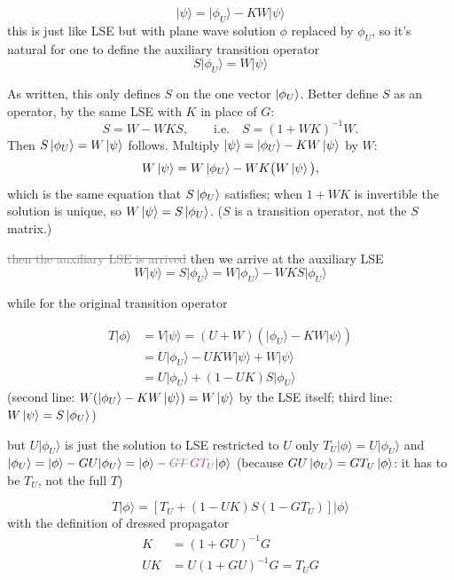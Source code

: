 \documentclass[11pt]{article}
\newcommand{\ai}[1]{\textcolor{aicolor}{#1}}
\newcommand{\aifix}[2]{\textcolor{gray}{\sout{#1}} \textcolor{aicolor}{#2}}
\newcommand{\aifixm}[2]{\textcolor{gray}{\text{\sout{$#1$}}}\,\textcolor{aicolor}{#2}}
\newcommand{\ai}[1]{#1}
\newcommand{\aifix}[2]{#2}
\newcommand{\aifixm}[2]{#2}
\newenvironment{aiadd}{\par}{\par}
\begin{document}
\[
	\lvert \psi \rangle = \lvert \phi_U \rangle - KW\lvert \psi \rangle
\]
this is just like LSE but with plane wave solution $\phi$ replaced by $\phi_U$, so it's natural for one to define the auxiliary transition operator
\[
	S\lvert \phi_U \rangle = W\lvert \psi \rangle
\]
\begin{aiadd}
	As written, this only defines $S$ on the one vector $\ket{\phi_U}$. Better define $S$ as an operator, by the same LSE with $K$ in place of $G$:
	\[
		S=W-WKS,\qquad\text{i.e.}\quad S=(1+WK)^{-1}W .
	\]
	Then $S\ket{\phi_U}=W\ket\psi$ follows. Multiply $\ket\psi=\ket{\phi_U}-KW\ket\psi$ by $W$:
	\[
		W\ket\psi=W\ket{\phi_U}-WK\big(W\ket\psi\big),
	\]
	which is the same equation that $S\ket{\phi_U}$ satisfies; when $1+WK$ is invertible the solution is unique, so $W\ket\psi=S\ket{\phi_U}$. ($S$ is a transition operator, not the $S$ matrix.)
\end{aiadd}

\aifix{then the auxiliary LSE is arrived}{then we arrive at the auxiliary LSE}
\[
	W\lvert \psi \rangle = S\lvert \phi_U \rangle = W\lvert \phi_U \rangle - WKS\lvert \phi_U \rangle
\]

while for the original transition operator

\begin{align}
	T\lvert \phi \rangle & = V\lvert \psi \rangle = (U + W)\left(\lvert \phi_U \rangle - KW\lvert \psi \rangle\right) \\
	                     & = U\lvert \phi_U \rangle - UKW\lvert \psi \rangle + W\lvert \psi \rangle                   \\
	                     & = U\lvert \phi_U \rangle + (1 - UK)S\lvert \phi_U \rangle
\end{align}
\ai{(second line: $W(\ket{\phi_U}-KW\ket\psi)=W\ket\psi$ by the LSE itself; third line: $W\ket\psi=S\ket{\phi_U}$)}

but $U\lvert \phi_U \rangle$ is just the solution to LSE restricted to $U$ only $T_U\lvert \phi \rangle = U\lvert \phi_U \rangle$ and $\lvert \phi_U \rangle = \lvert \phi \rangle - GU\lvert \phi_U \rangle = \lvert \phi \rangle - \aifixm{GT}{GT_U}\lvert \phi \rangle$ \ai{(because $GU\ket{\phi_U}=GT_U\ket\phi$: it has to be $T_U$, not the full $T$)}

\[
	T\lvert \phi \rangle = \left[T_U + (1 - UK)S(1 - GT_U)\right]\lvert \phi \rangle
\]
with the definition of dressed propagator
\begin{align}
	K  & = (1 + GU)^{-1}G         \\
	UK & = U(1 + GU)^{-1}G = T_UG
\end{align}
\end{document}
